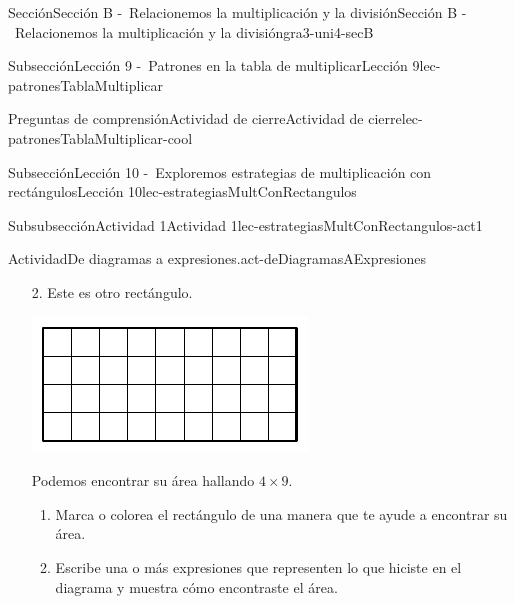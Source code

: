 \begin{sectionptx}{Sección}{Sección B -~Relacionemos la multiplicación y la división}{}{Sección B -~Relacionemos la multiplicación y la división}{}{}{gra3-uni4-secB}
\begin{subsectionptx}{Subsección}{Lección 9 -~Patrones en la tabla de multiplicar}{}{Lección 9}{}{}{lec-patronesTablaMultiplicar}
%
%
\typeout{************************************************}
\typeout{************************************************}
%
\begin{reading-questions-subsubsection}{Preguntas de comprensión}{Actividad de cierre}{}{Actividad de cierre}{}{}{lec-patronesTablaMultiplicar-cool}
%
\end{reading-questions-subsubsection}
\end{subsectionptx}
%
%
\typeout{************************************************}
\typeout{************************************************}
%
\begin{subsectionptx}{Subsección}{Lección 10 -~Exploremos estrategias de multiplicación con rectángulos}{}{Lección 10}{}{}{lec-estrategiasMultConRectangulos}
%
%
\typeout{************************************************}
\typeout{************************************************}
%
\clearpage
\begin{subsubsectionptx}{Subsubsección}{Actividad 1}{}{Actividad 1}{}{}{lec-estrategiasMultConRectangulos-act1}
\begin{activity}{Actividad}{De diagramas a expresiones.}{act-deDiagramasAExpresiones}%
%
\begin{enumerate}
\item[2.] Este es otro rectángulo.%
\begin{image}{0}{1}{0}{}%
\includegraphics[max width=\linewidth, center]{external/svg-source/tikz-file-153048.pdf}
\end{image}%
Podemos encontrar su área hallando \(4 \times 9\).%
%
\begin{enumerate}
\item{}Marca o colorea el rectángulo de una manera que te ayude a encontrar su área.%
\item{}Escribe una o más expresiones que representen lo que hiciste en el diagrama y muestra cómo encontraste el área.%

\end{enumerate}
\end{enumerate}
\end{activity}
\end{subsubsectionptx}
\end{subsectionptx}
\end{sectionptx}
